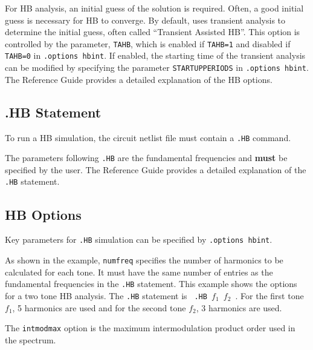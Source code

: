 For HB analysis, an initial guess of the solution is required. Often,
a good initial guess is necessary for HB to converge. By default,
\Xyce{} uses transient analysis to determine the initial guess, often
called ``Transient Assisted HB''.  This option is controlled by the
parameter, \verb|TAHB|, which is enabled if \verb|TAHB=1| and disabled
if \verb|TAHB=0| in \verb|.options hbint|. If enabled, the starting
time of the transient analysis can be modified by specifying the
parameter \verb|STARTUPPERIODS| in \verb|.options hbint|. The \Xyce{}
Reference Guide\ReferenceGuide{} provides a detailed explanation of
the HB options.

\subsection{.HB Statement}

To run a HB simulation, the circuit netlist file must contain a \verb|.HB| command.


The parameters following \verb|.HB| are the fundamental frequencies and {\bf must} be
specified by the user. The \Xyce{} Reference Guide\ReferenceGuide{} provides a detailed 
explanation of the \verb|.HB| statement.


\subsection{HB Options}

Key parameters for \verb|.HB| simulation can be specified by
\verb|.options hbint|.
 

As shown in the example, \texttt{numfreq} specifies the number of
harmonics to be calculated for each tone. It must have the same number
of entries as the fundamental frequencies in the \verb|.HB| statement.
This example shows the options for a two tone HB analysis.  The
\verb|.HB| statement is \texttt{ .HB $f_1$ $f_2$ }. For the first tone
$f_1$, 5 harmonics are used and for the second tone $f_2$, 3 harmonics
are used.

The \texttt{intmodmax} option is the maximum intermodulation product
order used in the spectrum.

